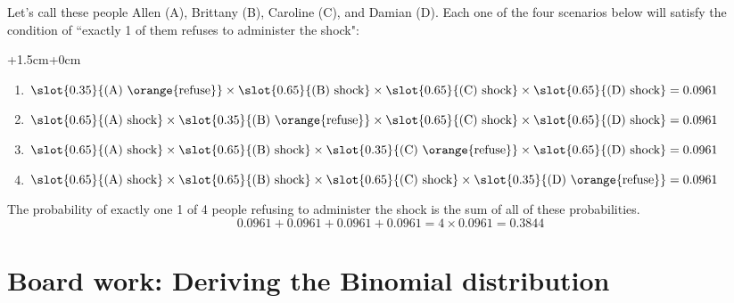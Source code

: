 \documentclass[slidestop,compress,mathserif]{beamer}
\begin{document}
\begin{frame}

\pause
Let's call these people Allen (A), Brittany (B), Caroline (C), and Damian (D). Each one of the four scenarios below will satisfy the condition of ``exactly 1 of them refuses to administer the shock": \\
\vspace{0.25cm}
\pause
\begin{changemargin}{+1.5cm}{+0cm}
{\footnotesize
\begin{enumerate}
\item[Scenario 1:] $\slot{0.35}{\text{(A) \orange{refuse}}} \times \slot{0.65}{\text{(B) shock}} \times \slot{0.65}{\text{(C) shock}} \times \slot{0.65}{\text{(D) shock}} = 0.0961$
\pause
\item[Scenario 2:] $\slot{0.65}{\text{(A) shock}} \times \slot{0.35}{\text{(B) \orange{refuse}}}\times \slot{0.65}{\text{(C) shock}} \times \slot{0.65}{\text{(D) shock}} = 0.0961$
\pause
\item[Scenario 3:] $\slot{0.65}{\text{(A) shock}} \times \slot{0.65}{\text{(B) shock}} \times \slot{0.35}{\text{(C) \orange{refuse}}}\times \slot{0.65}{\text{(D) shock}} = 0.0961$
\pause
\item[Scenario 4:] $\slot{0.65}{\text{(A) shock}} \times \slot{0.65}{\text{(B) shock}} \times \slot{0.65}{\text{(C) shock}} \times \slot{0.35}{\text{(D) \orange{refuse}}} = 0.0961$
\end{enumerate}
}
\end{changemargin}
\pause
The probability of exactly one 1 of 4 people refusing to administer the shock is the sum of all of these probabilities.
\[ 0.0961+ 0.0961 + 0.0961 + 0.0961 = 4 \times 0.0961 = 0.3844 \]

\end{frame}


\section{Board work: Deriving the Binomial distribution}

\end{document}
